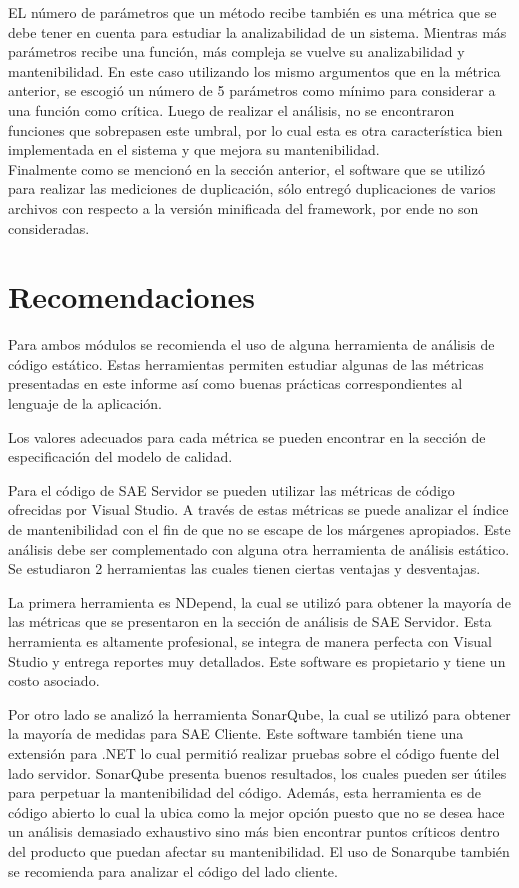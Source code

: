EL número de parámetros que un método recibe también es una métrica que se debe 
tener en cuenta para estudiar la analizabilidad de un sistema. Mientras más 
parámetros recibe una función, más compleja se vuelve su analizabilidad y 
mantenibilidad. En este caso utilizando los mismo argumentos que en la métrica 
anterior, se escogió un número de 5 parámetros como mínimo para considerar a 
una función como crítica. Luego de realizar el análisis, no se encontraron 
funciones que sobrepasen este umbral, por lo cual esta es otra característica 
bien implementada en el sistema y que mejora su mantenibilidad.
\\

Finalmente como se mencionó en la sección anterior, el software que se utilizó 
para realizar las mediciones de duplicación, sólo entregó duplicaciones de 
varios archivos con respecto a la versión minificada del framework, por ende 
no son consideradas.

\section{Recomendaciones}

Para ambos módulos se recomienda el uso de alguna herramienta de análisis 
de código estático. Estas herramientas permiten estudiar algunas de las métricas 
presentadas en este informe así como buenas prácticas correspondientes al 
lenguaje de la aplicación.

Los valores adecuados para cada métrica se pueden encontrar en la 
sección de especificación del modelo de calidad.

Para el código de SAE Servidor se pueden utilizar las métricas de código 
ofrecidas por Visual Studio. A través de estas métricas se puede analizar el 
índice de mantenibilidad con el fin de que no se escape de los márgenes 
apropiados. Este análisis debe ser complementado con alguna otra herramienta 
de análisis estático. Se estudiaron 2 herramientas las cuales tienen ciertas 
ventajas y desventajas. 

La primera herramienta es NDepend, la cual se utilizó para obtener la mayoría 
de las métricas que se presentaron en la sección de análisis de SAE Servidor. 
Esta herramienta es altamente profesional, se integra de manera perfecta con 
Visual Studio y entrega reportes muy detallados. Este software es propietario 
y tiene un costo asociado.

Por otro lado se analizó la herramienta SonarQube, la cual se utilizó para 
obtener la mayoría de medidas para SAE Cliente. Este software también tiene 
una extensión para .NET lo cual permitió realizar pruebas sobre el código 
fuente del lado servidor.
SonarQube presenta buenos resultados, los cuales pueden ser útiles para 
perpetuar la mantenibilidad del código. Además, esta herramienta es de código 
abierto lo cual la ubica como la mejor opción puesto que no se desea hace un 
análisis demasiado exhaustivo sino más bien encontrar puntos críticos dentro 
del producto que puedan afectar su mantenibilidad. El uso de Sonarqube también 
se recomienda para analizar el código del lado cliente.



